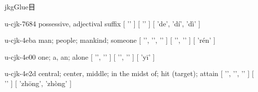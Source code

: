 \begin{multicols}{2}
jkgGlue{\cjk{}目}\cjkgGlue{}\cjkgGlue{}\cjkgGlue{}\cjkgGlue{}\cjkgGlue{}\cjkgGlue{}\cjkgGlue{}\cjkgGlue{}\cjkgGlue{}\cjkgGlue{}\cjkgGlue{}\cjkgGlue{}\cjkgGlue{}

\lettrine[lines=3]{\cjkgGlue{}}{}\begin{minipage}{0.8\linewidth} u-cjk-7684  possessive, adjectival suffix  [ '\cjkgGlue{}' ]  [ '\cjkgGlue{}' ]  [ 'de', 'dí', 'dì' ] \end{minipage}

\lettrine[lines=3]{\cjkgGlue{}}{}\begin{minipage}{0.8\linewidth} u-cjk-4eba  man; people; mankind; someone  [ '\cjkgGlue{}', '\cjkgGlue{}', '\cjkgGlue{}' ]  [ '\cjkgGlue{}', '\cjkgGlue{}' ]  [ 'rén' ] \end{minipage}

\lettrine[lines=3]{\cjkgGlue{}}{}\begin{minipage}{0.8\linewidth} u-cjk-4e00  one; a, an; alone  [ '\cjkgGlue{}', '\cjkgGlue{}' ]  [ '\cjkgGlue{}', '\cjkgGlue{}' ]  [ 'yī' ] \end{minipage}

\lettrine[lines=3]{\cjkgGlue{}}{}\begin{minipage}{0.8\linewidth} u-cjk-4e2d  central; center, middle; in the midst of; hit (target); attain  [ '\cjkgGlue{}', '\cjkgGlue{}', '\cjkgGlue{}' ]  [ '\cjkgGlue{}' ]  [ 'zhōng', 'zhòng' ] \end{minipage}


\end{multicols}
